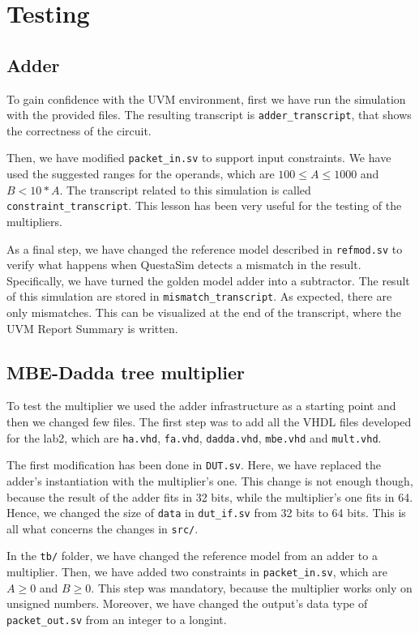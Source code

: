 \chapter{Testing}

\section{Adder}
To gain confidence with the UVM environment, first we have run the simulation with the provided files.
The resulting transcript is \verb|adder_transcript|, that shows the correctness of the circuit.

Then, we have modified \verb|packet_in.sv| to support input constraints. We have used the suggested
ranges for the operands, which are $100 \leq A \leq 1000$ and $B < 10*A$. The transcript related to this
simulation is called \verb|constraint_transcript|. This lesson has been very useful for the testing
of the multipliers.

As a final step, we have changed the reference model described in \verb|refmod.sv| to verify what happens
when QuestaSim detects a mismatch in the result. Specifically, we have turned the golden model adder into a
subtractor. The result of this simulation are stored in \verb|mismatch_transcript|. As expected, there are
only mismatches. This can be visualized at the end of the transcript, where the UVM Report Summary is written.

\section{MBE-Dadda tree multiplier}
To test the multiplier we used the adder infrastructure as a starting point and then we changed few files.
The first step was to add all the VHDL files developed for the lab2, which are \verb|ha.vhd|, \verb|fa.vhd|,
\verb|dadda.vhd|, \verb|mbe.vhd| and \verb|mult.vhd|.

The first modification has been done in \verb|DUT.sv|. Here, we have replaced the adder's instantiation with
the multiplier's one. This change is not enough though, because the result of the adder fits in 32 bits, while
the multiplier's one fits in 64. Hence, we changed the size of \verb|data| in \verb|dut_if.sv| from 32 bits to
64 bits. This is all what concerns the changes in \verb|src/|.

In the \verb|tb/| folder, we have changed the reference model from an adder to a multiplier. Then, we have added
two constraints in \verb|packet_in.sv|, which are $A \geq 0$ and $B \geq 0$. This step was mandatory, because
the multiplier works only on unsigned numbers. Moreover, we have changed the output's data type of \verb|packet_out.sv|
from an integer to a longint.

